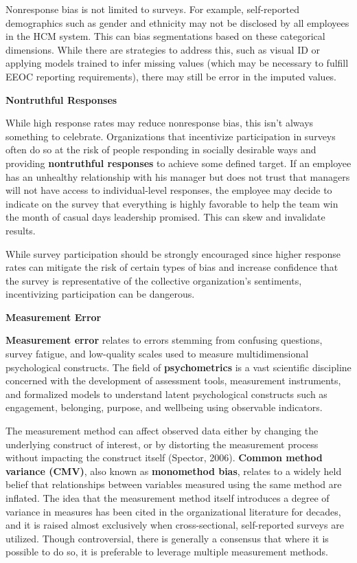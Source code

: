 \documentclass[
]{book}
\begin{document}
Nonresponse bias is not limited to surveys. For example, self-reported demographics such as gender and ethnicity may not be disclosed by all employees in the HCM system. This can bias segmentations based on these categorical dimensions. While there are strategies to address this, such as visual ID or applying models trained to infer missing values (which may be necessary to fulfill EEOC reporting requirements), there may still be error in the imputed values.

\textbf{Nontruthful Responses}

While high response rates may reduce nonresponse bias, this isn't always something to celebrate. Organizations that incentivize participation in surveys often do so at the risk of people responding in socially desirable ways and providing \textbf{nontruthful responses} to achieve some defined target. If an employee has an unhealthy relationship with his manager but does not trust that managers will not have access to individual-level responses, the employee may decide to indicate on the survey that everything is highly favorable to help the team win the month of casual days leadership promised. This can skew and invalidate results.

While survey participation should be strongly encouraged since higher response rates can mitigate the risk of certain types of bias and increase confidence that the survey is representative of the collective organization's sentiments, incentivizing participation can be dangerous.

\textbf{Measurement Error}

\textbf{Measurement error} relates to errors stemming from confusing questions, survey fatigue, and low-quality scales used to measure multidimensional psychological constructs. The field of \textbf{psychometrics} is a vast scientific discipline concerned with the development of assessment tools, measurement instruments, and formalized models to understand latent psychological constructs such as engagement, belonging, purpose, and wellbeing using observable indicators.

The measurement method can affect observed data either by changing the underlying construct of interest, or by distorting the measurement process without impacting the construct itself (Spector, 2006). \textbf{Common method variance (CMV)}, also known as \textbf{monomethod bias}, relates to a widely held belief that relationships between variables measured using the same method are inflated. The idea that the measurement method itself introduces a degree of variance in measures has been cited in the organizational literature for decades, and it is raised almost exclusively when cross-sectional, self-reported surveys are utilized. Though controversial, there is generally a consensus that where it is possible to do so, it is preferable to leverage multiple measurement methods.
\end{document}
